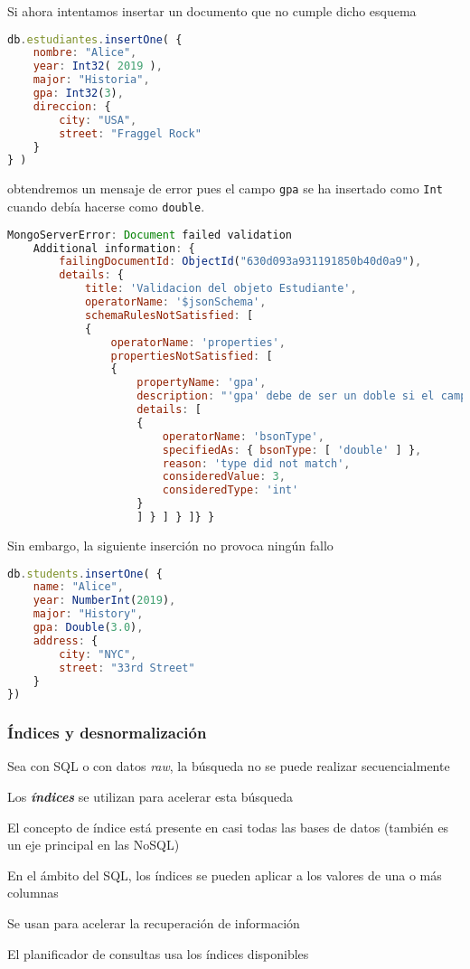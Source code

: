 Si ahora intentamos insertar un documento que no cumple dicho esquema 
\begin{lstlisting}[language=JavaScript]
db.estudiantes.insertOne( {
	nombre: "Alice",
	year: Int32( 2019 ),
	major: "Historia",
	gpa: Int32(3),
	direccion: {
		city: "USA",
		street: "Fraggel Rock"
	}
} ) 
\end{lstlisting}
obtendremos un mensaje de error pues el campo \texttt{gpa} se ha insertado como \texttt{Int} cuando debía hacerse como \texttt{double}.
\begin{lstlisting}[language=JavaScript]
	MongoServerError: Document failed validation
	Additional information: {
		failingDocumentId: ObjectId("630d093a931191850b40d0a9"),
		details: {
			title: 'Validacion del objeto Estudiante',
			operatorName: '$jsonSchema',
			schemaRulesNotSatisfied: [
			{
				operatorName: 'properties',
				propertiesNotSatisfied: [
				{
					propertyName: 'gpa',
					description: "'gpa' debe de ser un doble si el campo existe",
					details: [
					{
						operatorName: 'bsonType',
						specifiedAs: { bsonType: [ 'double' ] },
						reason: 'type did not match',
						consideredValue: 3,
						consideredType: 'int'
					}
					] } ] } ]} }
\end{lstlisting}

Sin embargo, la siguiente inserción no provoca ningún fallo
\begin{lstlisting}[language=JavaScript]
db.students.insertOne( {
	name: "Alice",
	year: NumberInt(2019),
	major: "History",
	gpa: Double(3.0),
	address: {
		city: "NYC",
		street: "33rd Street"
	}
})
\end{lstlisting}
\subsubsection{Índices y desnormalización}
Sea con SQL o con datos \textit{raw}, la búsqueda no se puede realizar secuencialmente

Los \textbf{\textit{índices}} se utilizan para acelerar esta búsqueda

El concepto de índice está presente en casi todas las bases de datos (también es un eje principal en las NoSQL)

En el ámbito del SQL, los índices se pueden aplicar a los valores de una o más columnas

Se usan para acelerar la recuperación de información

El planificador de consultas usa los índices disponibles


